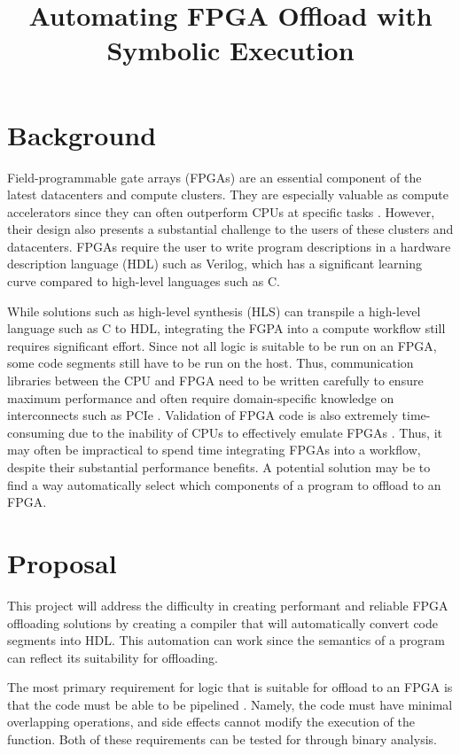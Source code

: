 \documentclass[11pt]{article}
\title{\vspace{-2cm} {Automating FPGA Offload with Symbolic Execution}}
\date{\vspace{-2cm}}
\begin{document}
\maketitle

\section{Background}

Field-programmable gate arrays (FPGAs) are an essential component of the latest datacenters and compute clusters.
They are especially valuable as compute accelerators since they can often outperform CPUs at specific tasks \cite{ma2017optimizing}.
However, their design also presents a substantial challenge to the users of these clusters and datacenters.
FPGAs require the user to write program descriptions in a hardware description language (HDL) such as Verilog, which has a significant learning curve compared to high-level languages such as C.

While solutions such as high-level synthesis (HLS) can transpile a high-level language such as C to HDL, integrating the FGPA into a compute workflow still requires significant effort.
Since not all logic is suitable to be run on an FPGA, some code segments still have to be run on the host.
Thus, communication libraries between the CPU and FPGA need to be written carefully to ensure maximum performance and often require domain-specific knowledge on interconnects such as PCIe \cite{sommer2017openmp}.
Validation of FPGA code is also extremely time-consuming due to the inability of CPUs to effectively emulate FPGAs \cite{simpson2010fpga}.
Thus, it may often be impractical to spend time integrating FPGAs into a workflow, despite their substantial performance benefits.
A potential solution may be to find a way automatically select which components of a program to offload to an FPGA.

\section {Proposal}

This project will address the difficulty in creating performant and reliable FPGA offloading solutions by creating a compiler that will automatically convert code segments into HDL.
This automation can work since the semantics of a program can reflect its suitability for offloading.

The most primary requirement for logic that is suitable for offload to an FPGA is that the code must be able to be pipelined \cite{simpson2010fpga}.
Namely, the code must have minimal overlapping operations, and side effects cannot modify the execution of the function. 
Both of these requirements can be tested for through binary analysis.
\end{document}
